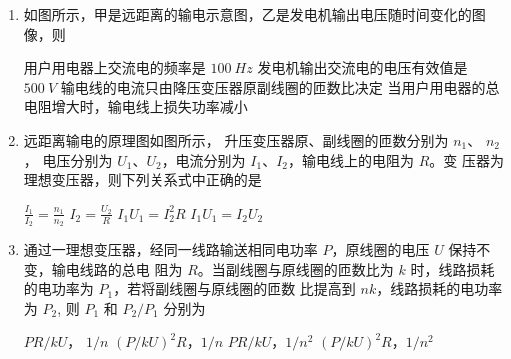 
\begin{enumerate}
\item
{}
如图所示，甲是远距离的输电示意图，乙是发电机输出电压随时间变化的图像，则  
\begin{figure}[h!]
\centering
\begin{subfigure}{0.4\linewidth}
\centering
 
\caption{}\label{}
\end{subfigure}
\begin{subfigure}{0.4\linewidth}
\centering
 
\caption{}\label{}
\end{subfigure}
\end{figure}



\fourchoices
{用户用电器上交流电的频率是 $ 100 \ Hz $}
{发电机输出交流电的电压有效值是 $ 500 \ V $}
{输电线的电流只由降压变压器原副线圈的匝数比决定}
{当用户用电器的总电阻增大时，输电线上损失功率减小}


\item 
{}
远距离输电的原理图如图所示， 升压变压器原、副线圈的匝数分别为 $ n_{1} $、 $ n_{2} $， 电压分别为
$ U_{1} $、$ U_{2} $，电流分别为 $ I_{1} $、$ I_{2} $，输电线上的电阻为 $ R $。变
压器为理想变压器，则下列关系式中正确的是  
\begin{figure}[h!]
\centering

\end{figure}


\fourchoices
{$\frac{I_{1}}{I_{2}}=\frac{n_{1}}{n_{2}}$}
{$I_{2}=\frac{U_{2}}{R}$}
{$I_{1} U_{1}=I_{2}^{2} R$}
{$I_{1} U_{1}=I_{2} U_{2}$}


\item 
{}
通过一理想变压器，经同一线路输送相同电功率 $ P $，原线圈的电压 $ U $ 保持不变，输电线路的总电
阻为 $ R $。当副线圈与原线圈的匝数比为 $ k $ 时，线路损耗的电功率为 $ P_{1} $，若将副线圈与原线圈的匝数
比提高到 $ nk $，线路损耗的电功率为 $ P_{2} $, 则 $ P_{1} $ 和 $ P_{2} / P_{1} $ 分别为  


\fourchoices
{$ PR/kU $， $ 1/n $}
{$ (P/kU)^{2}R $，$ 1/n $}
{$ PR/kU $，$ 1/ n^{2} $}
{$ (P/kU)^{2}R $，$ 1/ n^{2} $}



\end{enumerate}
